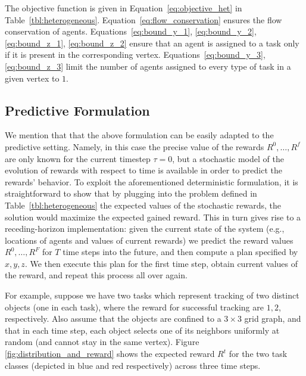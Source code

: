\documentclass[conference]{IEEEtran}
\newcommand{\ksline}[2]{{\color{blue}#1}{\em \color{blue}[KS]: #2}}
\newcommand{\todo}[1]{{\color{red}{\bf TODO:} #1}}
\newcommand{\ksline}[2]{#1}
\newcommand{\todo}[1]{}
\begin{document}
The objective function is given in Equation~\eqref{eq:objective_het} in Table~\ref{tbl:heterogeneous}. Equation~\eqref{eq:flow_conservation} ensures the flow conservation of agents. 
Equations~\eqref{eq:bound_y_1}, \eqref{eq:bound_y_2}, \eqref{eq:bound_z_1}, \eqref{eq:bound_z_2} ensure that an agent is assigned to a task only if it is present in the corresponding vertex.    Equations~\eqref{eq:bound_y_3}, \eqref{eq:bound_z_3} limit the number of agents assigned to every type of task in a given vertex to $1$. 

\subsection{Predictive Formulation}\label{sec:predictive}
We mention that that the above formulation can be easily adapted to the predictive setting. Namely, in this case the precise value of the rewards $R^0,\ldots,R^f$ are only known for the current timestep $\tau=0$, but a stochastic model of the evolution of rewards with respect to time is available in order to predict the rewards' behavior. To exploit the aforementioned deterministic formulation, it is straightforward to show that by plugging into the problem defined in Table~\ref{tbl:heterogeneous} the expected values of the stochastic rewards, the solution would maximize the expected gained reward. This in turn gives rise to a receding-horizon implementation: given the current state of the system (e.g., locations of agents and values of current rewards) we predict the reward values $R^0,\ldots,R^F$ for $T$ time steps into the future, and then compute a plan specified by $x,y,z$. We then execute this plan for the first time step, obtain current values of the reward, and repeat this process all over again. 


For example, suppose we have two tasks which represent tracking of two distinct objects (one in each task), where the reward for successful tracking are $1, 2$, respectively. Also assume that the objects are confined to a $3\times 3$ grid graph, and that in each time step, each object selects one of its neighbors uniformly at random (and cannot stay in the same vertex). Figure \ref{fig:distribution_and_reward} shows the expected reward $R^t$ for the two task classes (depicted in blue and red respectively) across three time steps.
\end{document}
